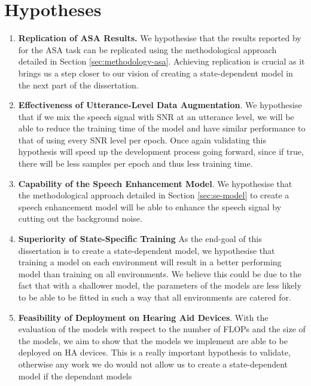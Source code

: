 \documentclass[logo,bsc,singlespacing,parskip,online]{infthesis}
\begin{document}
\section{Hypotheses}
\label{sec:hypotheses}
\begin{enumerate}
   \item \textbf{Replication of ASA Results.} 
   We hypothesise that the results reported by \citet{Huwel2020HearDS} for the ASA task can be replicated using the methodological approach detailed in Section \ref{sec:methodology-asa}.
   Achieving replication is crucial as it brings us a step closer to our vision of creating a state-dependent model in the next part of the dissertation.
   \item \textbf{Effectiveness of Utterance-Level Data Augmentation}. We hypothesise 
   that if we mix the speech signal with SNR at an utterance level, we will be able 
   to reduce the training time of the model and have similar performance to that of using 
   every SNR level per epoch. 
   Once again validating this hypothesis will speed up the development process going forward, 
   since if true, there will be less samples per epoch and thus less training time. 
   \item \textbf{Capability of the Speech Enhancement Model}.
   We hypothesise that the methodological approach detailed in Section \ref{sec:se-model} to 
   create a speech enhancement model will be able to enhance the speech signal by 
   cutting out the background noise. 
   \item \textbf{Superiority of State-Specific Training}
   As the end-goal of this dissertation is to create a state-dependent model, we hypothesise that
   training a model on each environment will result in a better performing model than training on all environments.
   We believe this could be due to the fact that with a shallower model, the parameters of the models 
   are less likely to be able to be fitted in such a way that all environments are catered for. 
   \item \textbf{Feasibility of Deployment on Hearing Aid Devices}.
   With the evaluation of the models with respect to the number of FLOPs and the size of the models,
   we aim to show that the models we implement are able to be deployed on HA devices. 
   This is a really important hypothesis to validate, otherwise any work 
   we do would not allow us to create a state-dependent model if the dependant models 

\end{enumerate}
\end{document}
